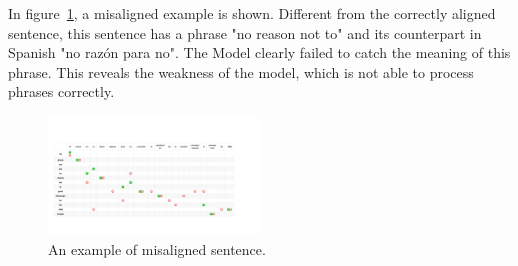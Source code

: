 In figure~\ref{fig:align2}, a misaligned example is shown. Different from the correctly aligned sentence, this sentence has a phrase "no reason not to" and its counterpart in Spanish "no razón para no". The Model clearly failed to catch the meaning of this phrase. This reveals the weakness of the model, which is not able to process phrases correctly.

\begin{figure}[!ht]
    \centering
    \includegraphics[width=0.5\textwidth]{files/figs/2.pdf}
    \caption[]%
    {\small An example of misaligned sentence. }
    \label{fig:align2}
\end{figure}

